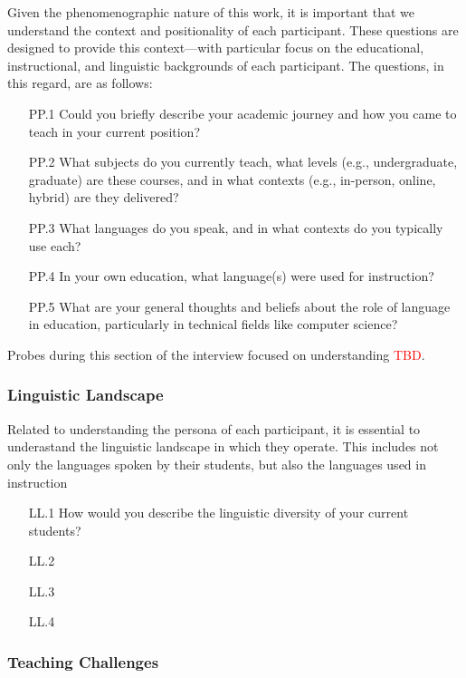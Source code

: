 Given the phenomenographic nature of this work, it is important that we
understand the context and positionality of each participant. These questions
are designed to provide this context---with particular focus on the
educational, instructional, and linguistic backgrounds of each participant. The
questions, in this regard, are as follows:
\begin{enumerate}
  \item[PP.1] Could you briefly describe your academic journey and how you came to
    teach in your current position?
  \item[PP.2] What subjects do you currently teach, what levels (e.g., undergraduate,
    graduate) are these courses, and in what contexts (e.g., in-person, online,
    hybrid) are they delivered?
  \item[PP.3] What languages do you speak, and in what contexts do you typically use
    each?
  \item[PP.4] In your own education, what language(s) were used for instruction?
  \item[PP.5] What are your general thoughts and beliefs about the role of language in
    education, particularly in technical fields like computer science?
\end{enumerate}
Probes during this section of the interview focused on understanding
\textcolor{red}{TBD}.

\subsubsection{Linguistic Landscape}\label{subsubsec:linguistic-landscape}

Related to understanding the persona of each participant, it is essential to
underastand the linguistic landscape in which they operate. This includes not
only the languages spoken by their students, but also the languages used in
instruction
\begin{enumerate}
  \item[LL.1] How would you describe the linguistic diversity of your current students? 
  \item[LL.2] 
  \item[LL.3] 
  \item[LL.4] 
\end{enumerate}

\subsubsection{Teaching Challenges}\label{subsubsec:teaching-challenges}

